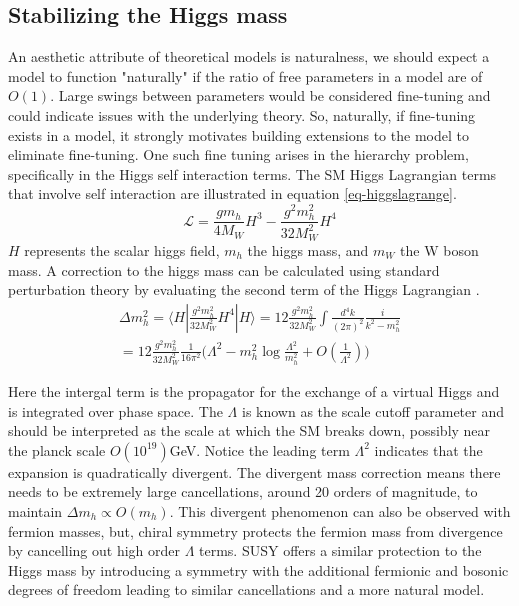 \subsection{Stabilizing the Higgs mass}

An aesthetic attribute of theoretical models is naturalness, we should expect a model to function "naturally" if the ratio of free parameters in a model are of $O(1)$. Large swings between parameters would be considered fine-tuning and could indicate issues with the underlying theory. So, naturally, if fine-tuning exists in a model, it strongly motivates building extensions to the model to eliminate fine-tuning. %
One such fine tuning arises in the hierarchy problem, specifically in the Higgs self interaction terms. The SM Higgs Lagrangian terms that involve self interaction are illustrated in equation \ref{eq-higgslagrange}.
\begin{equation}
\label{eq-higgslagrange}
\mathcal{L}=\frac{gm_h}{4M_W}H^3 - \frac{g^2m_h^2}{32M_W^2}H^4
\end{equation}
$H$ represents the scalar higgs field, $m_h$ the higgs mass, and $m_W$ the W boson  mass. A correction to the higgs mass can be calculated using standard perturbation theory by evaluating the second term of the Higgs Lagrangian \cite{Baer:2007izw}. 
\begin{equation}
\begin{split}
\Delta m_h^2 = \langle H | \frac{g^2m_h^2}{32M_W^2} H^4 | H  \rangle = 12\frac{g^2m_h^2}{32M_W^2}\int \frac{d^4 k}{(2\pi)^2} \frac{i}{k^2 - m_h^2}\\
= 12\frac{g^2m_h^2}{32M_W^2} \frac{1}{16\pi^2}\big( \Lambda^2 - m_h^2\log\frac{\Lambda^2}{m_h^2} + O(\frac{1}{\Lambda^2})\big)
\end{split} 
\end{equation}
 
 Here the intergal term is the propagator for the exchange of a virtual Higgs and is integrated over phase space. The $\Lambda$ is known as the scale cutoff parameter and should be interpreted as the scale at which the SM breaks down, possibly near the planck scale $O(10^{19})$GeV. Notice the leading term $\Lambda^2$ indicates that the expansion is quadratically divergent. The divergent mass correction means there needs to be extremely large cancellations, around 20 orders of magnitude, to maintain $\Delta m_h \propto O(m_h)$. This divergent phenomenon can also be observed with fermion masses, but, chiral symmetry protects the fermion mass from divergence by cancelling out high order $\Lambda$ terms. SUSY offers a similar protection to the Higgs mass by introducing a symmetry with the additional fermionic and bosonic degrees of freedom leading to similar cancellations and a more natural model. 


